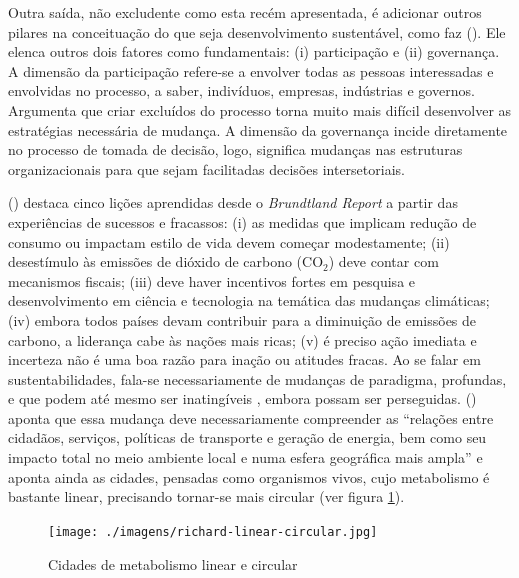 Outra saída, não excludente como esta recém apresentada, é adicionar outros pilares na conceituação do que seja desenvolvimento sustentável, como faz 
 (\citeyear{BANISTER2005}). Ele elenca outros dois fatores como fundamentais: (i) participação e (ii) governança. A dimensão da participação refere-se a envolver todas as pessoas interessadas e envolvidas no processo, a saber, indivíduos, empresas, indústrias e governos. Argumenta que criar excluídos do processo torna muito mais difícil desenvolver as estratégias necessária de mudança. A dimensão da governança incide diretamente no processo de tomada de decisão, logo, significa mudanças nas estruturas organizacionais para que sejam facilitadas decisões intersetoriais.

 (\citeyear{BANISTER2005}) destaca cinco lições aprendidas desde o \emph{Brundtland Report} a partir das experiências de sucessos e fracassos: (i) as medidas que implicam redução de consumo  ou impactam estilo de vida devem começar modestamente; (ii) desestímulo às emissões de dióxido de carbono (CO$_2$) deve contar com mecanismos fiscais; (iii) deve haver incentivos fortes em pesquisa e desenvolvimento em ciência e tecnologia na temática das mudanças climáticas; (iv) embora todos países devam contribuir para a diminuição de emissões de carbono, a liderança cabe às nações mais ricas; (v) é preciso ação imediata e incerteza não é uma boa razão para inação ou atitudes fracas.
Ao se falar em sustentabilidades, fala-se necessariamente de mudanças de paradigma, profundas, e que podem até mesmo ser inatingíveis \cite{GLASBY2002}, embora possam ser perseguidas.  (\citeyear{ROGERS2000}) aponta que essa mudança deve necessariamente compreender as ``relações entre cidadãos, serviços, políticas de transporte e geração de energia, bem como seu impacto total no meio ambiente local e numa esfera geográfica mais ampla'' e aponta ainda as cidades, pensadas como organismos vivos, cujo metabolismo é bastante linear, precisando tornar-se mais circular (ver figura \ref{fig:cidade-metabolismos}).

\begin{figure}[htb]%
    \caption{\label{fig:cidade-metabolismos}Cidades de metabolismo linear e circular}%
    \begin{center}%
        \texttt{[image: ./imagens/richard-linear-circular.jpg]}%
    \end{center}%
\end{figure}%

